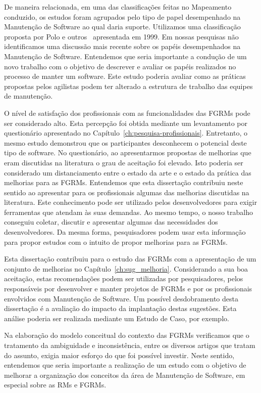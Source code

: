 De maneira relacionada, em uma das classificações feitas no Mapeamento
conduzido, os estudos foram agrupados pelo tipo de papel desempenhado na
Manutenção de Software ao qual daria suporte. Utilizamos uma classificação
proposta por Polo e outros~\cite{Polo1999} apresentada em 1999. Em nossas
pesquisas não identificamos uma discussão mais recente sobre os papéis
desempenhados na Manutenção de Software. Entendemos que seria importante a
condução de um novo trabalho com o objetivo de descrever e avaliar os papéis
realizados no processo de manter um software. Este estudo poderia avaliar como
as práticas propostas pelos agilistas podem ter alterado a estrutura de trabalho
das equipes de manutenção.

O nível de satisfação dos profissionais com as funcionalidades das FGRMs pode
ser considerado alto. Esta percepção foi obtida mediante um levantamento por
questionário apresentado no Capítulo~\ref{ch:pesquisa-profissionais}.
Entretanto, o mesmo estudo demonstrou que os participantes desconhecem o
potencial deste tipo de software. No questionário, ao apresentarmos propostas de
melhorias que eram discutidas na literatura o grau de aceitação foi elevado.
Isto poderia ser considerado um distanciamento entre o estado da arte e o estado
da prática das melhorias para as FGRMs. Entendemos que esta dissertação
contribuiu neste sentido ao apresentar para os profissionais algumas das
melhorias discutidas na literatura.  Este conhecimento pode ser utilizado pelos
desenvolvedores para exigir ferramentas que atendam às suas demandas. Ao mesmo
tempo, o nosso trabalho conseguiu coletar, discutir e apresentar algumas das
necessidades dos desenvolvedores. Da mesma forma, pesquisadores podem usar esta
informação para propor estudos com o intuito de propor melhorias para as FGRMs.

Esta dissertação contribuiu para o estudo das FGRMs com a apresentação de um
conjunto de melhorias no Capítulo~\ref{ch:sug_melhoria}. Considerando a sua boa
aceitação, estas recomendações podem ser utilizadas por pesquisadores, pelos
responsáveis por desenvolver e manter projetos de FGRMs e por os profissionais
envolvidos com Manutenção de Software. Um possível desdobramento desta
dissertação é a avaliação do impacto da implantação destas sugestões. Esta
análise poderia ser realizada mediante um Estudo de Caso, por exemplo.

Na elaboração do modelo conceitual do contexto das FGRMs verificamos que o
tratamento da ambiguidade e inconsistência, entre os diversos artigos que tratam
do assunto, exigia maior esforço do que foi possível investir. Neste sentido,
entendemos que seria importante a realização de um estudo com o objetivo de
melhorar a organização dos conceitos da área de Manutenção de Software, em
especial sobre as RMs e FGRMs.

